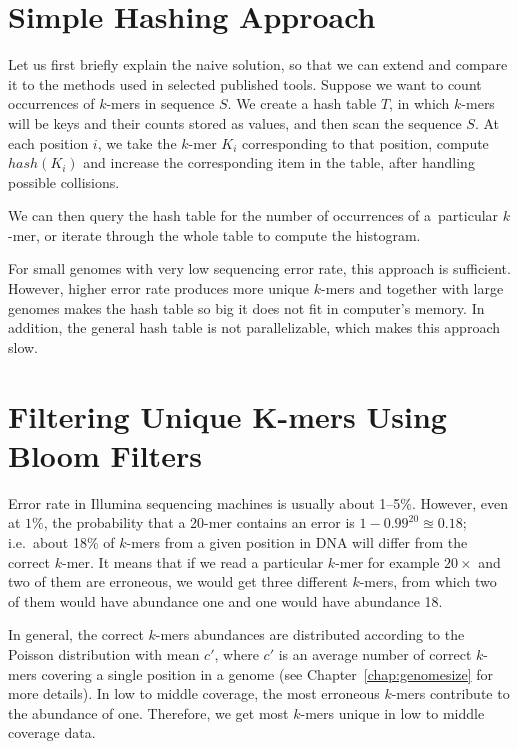 \section{Simple Hashing Approach}

Let us first briefly explain the naive solution, so that we can extend and compare it to the methods used in selected published tools.
Suppose we want to count occurrences of $k$-mers in sequence $S$.
We create a hash table $T$, in which $k$-mers will be keys and their counts stored as values, and then scan the sequence $S$.
At each position $i$, we take the $k$-mer $K_i$ corresponding to that  position, compute $hash(K_i)$ and increase the corresponding item in the table, after handling possible collisions.

We can then query the hash table for the number of occurrences of a~particular $k$-mer, or iterate through the whole table to compute the histogram.

For small genomes with very low sequencing error rate, this approach is sufficient. However, higher error rate produces more unique $k$-mers and together with large genomes makes the hash table so big it does not fit in computer's memory. In addition, the general hash table is not parallelizable, which makes this approach slow.

\section[Filtering Unique K-mers]{Filtering Unique K-mers Using Bloom Filters}

Error rate in Illumina sequencing machines is usually about 1--5\%. However, even at $1\%$, the probability that a 20-mer contains an error is $1 - 0.99^{20} \approxeq 0.18$; i.e.\ about 18\% of $k$-mers from a given position in DNA will differ from the correct $k$-mer. It means that if we read a particular $k$-mer for example $20\times$ and two of them are erroneous, we would get three different $k$-mers, from which two of them would have abundance one and one would have abundance 18.

In general, the correct $k$-mers abundances are distributed according to the Poisson distribution with mean $c'$, where $c'$ is an average number of correct $k$-mers covering a single position in a genome (see Chapter~\ref{chap:genomesize} for more details). In low to middle coverage, the most erroneous $k$-mers contribute to the abundance of one.
Therefore, we get most $k$-mers unique in low to middle coverage data.

